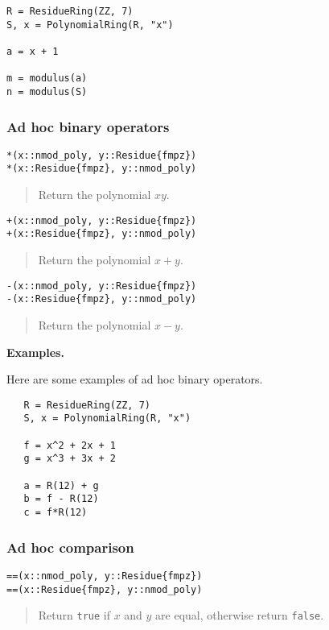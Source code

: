 \documentclass[a4paper,10pt]{article}
\newcommand{\code}{\lstinline}
\newcommand{\desc}[1]{\vspace{-3mm}\begin{quote}#1\end{quote}}
\begin{document}
{{\begin{lstlisting}
R = ResidueRing(ZZ, 7)
S, x = PolynomialRing(R, "x")

a = x + 1

m = modulus(a)
n = modulus(S)
\end{lstlisting}

\subsubsection{Ad hoc binary operators}

\begin{lstlisting}
*(x::nmod_poly, y::Residue{fmpz})
*(x::Residue{fmpz}, y::nmod_poly)
\end{lstlisting}

\desc{Return the polynomial $xy$.}

\begin{lstlisting}
+(x::nmod_poly, y::Residue{fmpz})
+(x::Residue{fmpz}, y::nmod_poly)
\end{lstlisting}

\desc{Return the polynomial $x + y$.}

\begin{lstlisting}
-(x::nmod_poly, y::Residue{fmpz})
-(x::Residue{fmpz}, y::nmod_poly)
\end{lstlisting}

\desc{Return the polynomial $x - y$.}

\textbf{Examples.}

Here are some examples of ad hoc binary operators.

\begin{lstlisting}
   R = ResidueRing(ZZ, 7)
   S, x = PolynomialRing(R, "x")

   f = x^2 + 2x + 1
   g = x^3 + 3x + 2

   a = R(12) + g
   b = f - R(12)
   c = f*R(12)
\end{lstlisting}

\subsubsection{Ad hoc comparison}

\begin{lstlisting}
==(x::nmod_poly, y::Residue{fmpz})
==(x::Residue{fmpz}, y::nmod_poly)
\end{lstlisting}

\desc{Return \code{true} if $x$ and $y$ are equal, otherwise return \code{false}.}

}}
\end{document}
